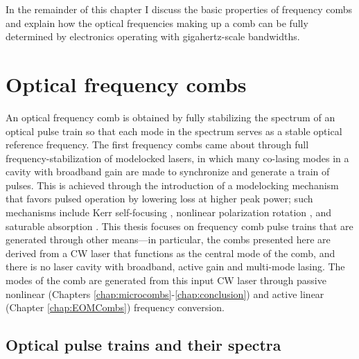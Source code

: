 In the remainder of this chapter I discuss the basic properties of frequency combs and explain how the optical frequencies making up a comb can be fully determined by electronics operating with gigahertz-scale bandwidths.

\section{Optical frequency combs}

An optical frequency comb is obtained by fully stabilizing the spectrum of an optical pulse train so that each mode in the spectrum serves as a stable optical reference frequency. The first frequency combs came about through full frequency-stabilization of modelocked lasers, in which many co-lasing modes in a cavity with broadband gain are made to synchronize and generate a train of pulses. This is achieved through the introduction of a modelocking mechanism that favors pulsed operation by lowering loss at higher peak power; such mechanisms include Kerr self-focusing \cite{Spence1991,Brabec1992}, nonlinear polarization rotation \cite{Hofer1992,Fermann1993}, and saturable absorption \cite{Stankov1988}. This thesis focuses on frequency comb pulse trains that are generated through other means---in particular, the combs presented here are derived from a CW laser that functions as the central mode of the comb, and there is no laser cavity with broadband, active gain and multi-mode lasing. The modes of the comb are generated from this input CW laser through passive nonlinear (Chapters \ref{chap:microcombs}-\ref{chap:conclusion}) and active linear (Chapter \ref{chap:EOMCombs}) frequency conversion.

\subsection{Optical pulse trains and their spectra}


